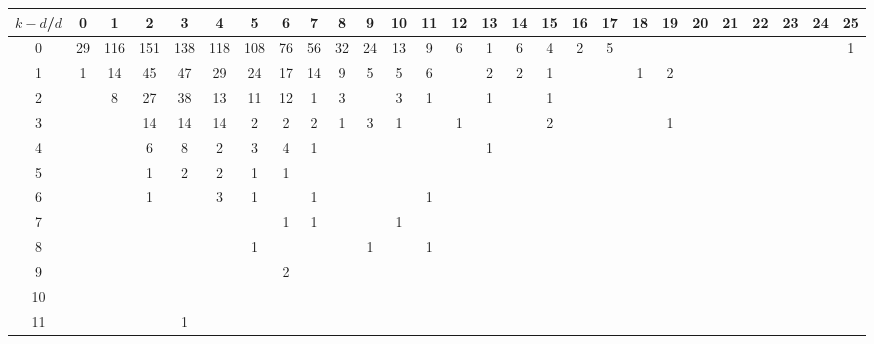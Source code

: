 \documentclass{article}[12pt]
\begin{document}
\begin{landscape}

\begin{table}[h]\footnotesize
{\centering
\begin{tabular}{|c|c|
c|c|c|c|c|c|c|c|c|c|c|c|c|c|c|c|c|c|c|c|c|c|c|c|c|}
  \hline
  $k-d$/$d$ 
 & 0 & 1 & 2 & 3 & 4 & 5 & 6 & 7 & 8 & 9 & 10 & 11 & 12 & 13 & 14 & 15 & 16 & 17 & 18 & 19 & 20 & 21 & 22 & 23 & 24 & 25\\

  \hline
  \hline

0  & 29 & 116 & 151 & 138 & 118 & 108 & 76 & 56 & 32 & 24 & 13 & 9 & 6 & 1 & 6 & 4 & 2 & 5 &  &  &  &  &  &  &  & 1\\

1  & 1 & 14 & 45 & 47 & 29 & 24 & 17 & 14 & 9 & 5 & 5 & 6 &  & 2 & 2 & 1 &  &  & 1 & 2 &  &  &  &  &  & \\

2  &  & 8 & 27 & 38 & 13 & 11 & 12 & 1 & 3 &  & 3 & 1 &  & 1 &  & 1 &  &  &  &  &  &  &  &  &  & \\

3  &  &  & 14 & 14 & 14 & 2 & 2 & 2 & 1 & 3 & 1 &  & 1 &  &  & 2 &  &  &  & 1 &  &  &  &  &  & \\

4  &  &  & 6 & 8 & 2 & 3 & 4 & 1 &  &  &  &  &  & 1 &  &  &  &  &  &  &  &  &  &  &  & \\

5  &  &  & 1 & 2 & 2 & 1 & 1 &  &  &  &  &  &  &  &  &  &  &  &  &  &  &  &  &  &  & \\

6  &  &  & 1 &  & 3 & 1 &  & 1 &  &  &  & 1 &  &  &  &  &  &  &  &  &  &  &  &  &  & \\

7  &  &  &  &  &  &  & 1 & 1 &  &  & 1 &  &  &  &  &  &  &  &  &  &  &  &  &  &  & \\

8  &  &  &  &  &  & 1 &  &  &  & 1 &  & 1 &  &  &  &  &  &  &  &  &  &  &  &  &  & \\

9  &  &  &  &  &  &  & 2 &  &  &  &  &  &  &  &  &  &  &  &  &  &  &  &  &  &  & \\

10  &  &  &  &  &  &  &  &  &  &  &  &  &  &  &  &  &  &  &  &  &  &  &  &  &  & \\

11  &  &  &  & 1 &  &  &  &  &  &  &  &  &  &  &  &  &  &  &  &  &  &  &  &  &  & \\


\end{tabular}}
\end{table}
\end{landscape}
\end{document}

